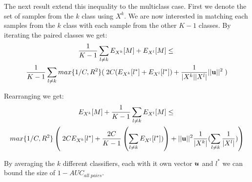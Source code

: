 The next result extend this inequality to the multiclass case. First we denote the set of samples from the $k$ class using $X^k$. We are now interested in matching each samples from the $k$ class with each sample from the other $K-1$ classes. By iterating the paired classes we get: 
\begin{multline}
\frac{1}{K-1} \sum\limits_{l \neq k} E_{X^k}[M] + E_{X^l}[M] \leq \; \\
\frac{1}{K-1} \sum\limits_{l \neq k} max\{1/C, R^2\}( \; 2C (E_{X^k}[l^{*}] + E_{X^l}[l^{*}]) + \frac{1}{|X^k| |X^l|}  ||{\bf u}||^2  \;) 
\end{multline}

Rearranging we get:
\begin{multline}
E_{X^k}[M] + \frac{1}{K-1} \sum\limits_{l \neq k}  E_{X^l}[M] \leq \; \\
max\{1/C, R^2\} \left( \; 2C E_{X^k}[l^{*}] + \frac{2C}{K-1} \left( \sum\limits_{l \neq k}  E_{X^l}[l^{*}]) \right) + ||{\bf u}||^2 \frac{1}{|X^k|} ( \sum\limits_{l \neq k} \frac{1}{|X^l|})    \right) 
\end{multline}

By averaging the $k$ different classifiers, each with it own vector $\bm{u}$ and $l^*$ we can bound the size of $ 1 - AUC_{all \; pairs}$.
\hfill\BlackBox
